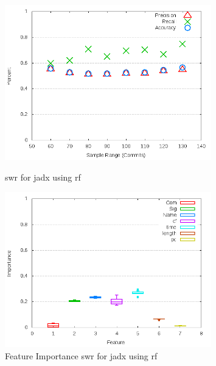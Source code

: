 \begin{figure}[!ht]
    \centering
        \includegraphics[width=0.8\textwidth]{images/rf/test_1/jadx_sample_range}
    \caption{\gls{swr} for jadx using \gls{rf}}
    \label{fig:test_1_jadx_rf}

    \includegraphics[width=0.8\textwidth]{images/rf/test_1/jadx_importance}
        \caption{Feature Importance \gls{swr} for jadx using \gls{rf}}
        \label{fig:test_1_jadx_rf_importance}
\end{figure}

